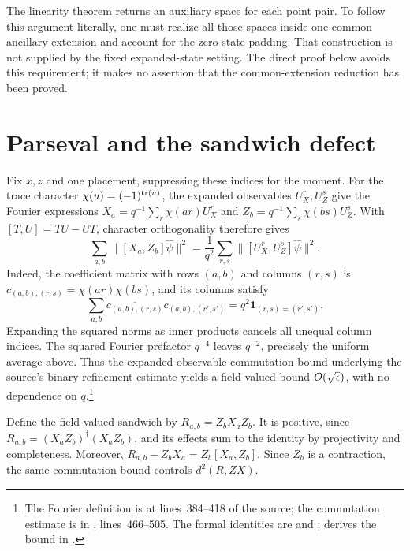 \documentclass[11pt]{article}
\begin{document}
The linearity theorem returns an auxiliary space for each point pair.  To
follow this argument literally, one must realize all those spaces inside
one common ancillary extension and account for the zero-state padding.
That construction is not supplied by the fixed expanded-state setting.
The direct proof below avoids this requirement; it makes no assertion that
the common-extension reduction has been proved.

\section{Parseval and the sandwich defect}

Fix $x,z$ and one placement, suppressing these indices for the moment.
For the trace character $\chi(u)=(-1)^{\mathrm{tr}(u)}$, the expanded observables
$U_X^r,U_Z^s$ give the Fourier expressions
$X_a=q^{-1}\sum_r\chi(ar)U_X^r$ and
$Z_b=q^{-1}\sum_s\chi(bs)U_Z^s$.
With $[T,U]=TU-UT$, character orthogonality therefore gives
\[
 \sum_{a,b}\|[X_a,Z_b]\hat\psi\|^2
   =\frac1{q^2}\sum_{r,s}\|[U_X^r,U_Z^s]\hat\psi\|^2.
\]
Indeed, the coefficient matrix with rows $(a,b)$ and columns $(r,s)$ is
$c_{(a,b),(r,s)}=\chi(ar)\chi(bs)$, and its columns satisfy
\[
 \sum_{a,b}\overline{c_{(a,b),(r,s)}}c_{(a,b),(r',s')}
   =q^2\mathbf{1}_{(r,s)=(r',s')}.
\]
Expanding the squared norms as inner products cancels all unequal column
indices.  The squared Fourier prefactor $q^{-4}$ leaves $q^{-2}$, precisely
the uniform average above.  Thus the expanded-observable commutation bound
underlying the source's binary-refinement estimate yields a field-valued
bound $O(\sqrt{\epsilon})$, with no dependence on $q$.\footnote{The Fourier
definition is at lines~384--418 of the source; the commutation estimate is
in , lines~466--505.  The formal identities are
 and
;
 derives the bound in
.}

Define the field-valued sandwich by $R_{a,b}=Z_bX_aZ_b$.
It is positive, since $R_{a,b}=(X_aZ_b)^\dagger(X_aZ_b)$, and its effects
sum to the identity by projectivity and completeness.  Moreover,
$R_{a,b}-Z_bX_a=Z_b[X_a,Z_b]$.  Since $Z_b$ is a contraction, the same
commutation bound controls $d^2(R,ZX)$.
\end{document}
